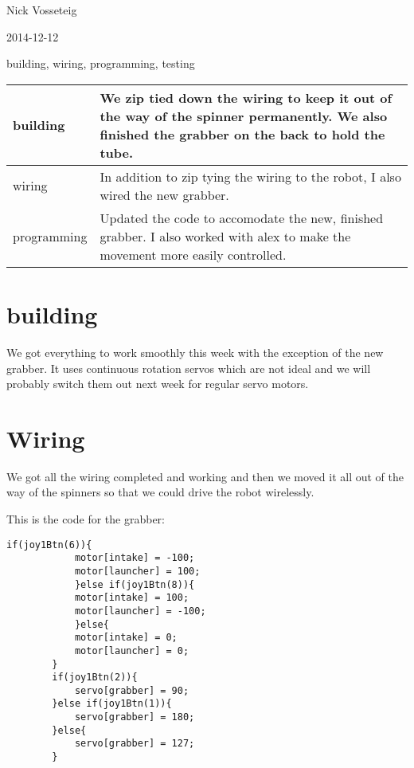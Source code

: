 Nick Vosseteig

2014-12-12

building, wiring, programming, testing

\begin{tabular}{|p{5cm}|p{5cm}|}
 \hline
 building&
We zip tied down the wiring to keep it out of the way of the spinner permanently. We also finished the grabber on the back to hold the tube. 
 \\
 \hline
wiring&
In addition to zip tying the wiring to the robot, I also wired the new grabber. 
 \\
 \hline
programming&
Updated the code to accomodate the new, finished grabber. I also worked with alex to make the movement more easily controlled.
 \\
 \hline
\end{tabular}

\section*{building}
We got everything to work smoothly this week with the exception of the new grabber. It uses continuous rotation servos which are not ideal and we will probably switch them out next week for regular servo motors.
\section*{Wiring}
We got all the wiring completed and working and then we moved it all out of the way of the spinners so that we could drive the robot wirelessly.

This is the code for the grabber:
\begin{lstlisting}[style = RobotC]	
		if(joy1Btn(6)){
			motor[intake] = -100;
			motor[launcher] = 100;
			}else if(joy1Btn(8)){
			motor[intake] = 100;
			motor[launcher] = -100;
			}else{
			motor[intake] = 0;
			motor[launcher] = 0;
		}
		if(joy1Btn(2)){
			servo[grabber] = 90;
		}else if(joy1Btn(1)){
			servo[grabber] = 180;
		}else{
			servo[grabber] = 127;
		}
\end{lstlisting}